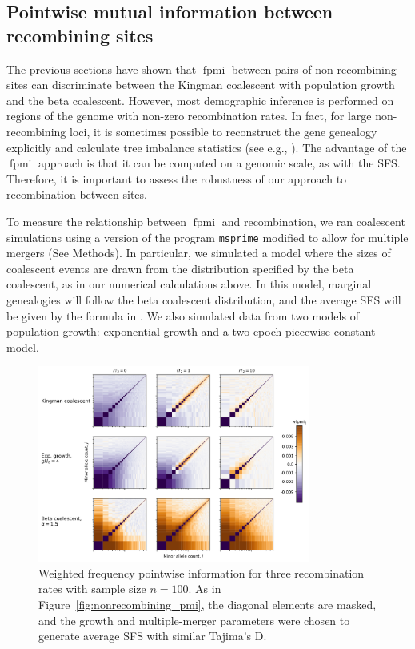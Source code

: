 \documentclass[11pt, letterpaper]{article}   	%
\newcommand{\Fig}[1]{Figure~\ref{#1}}
\DeclareMathOperator{\fpmi}{fpmi}
\begin{document}
\subsection*{Pointwise mutual information between recombining sites}

The previous sections have shown that $\fpmi$ between pairs of non-recombining sites can discriminate between the Kingman coalescent with population growth and the beta coalescent.
However, most demographic inference is performed on regions of the genome with non-zero recombination rates.
In fact, for large non-recombining loci, it is sometimes possible to reconstruct the gene genealogy explicitly and calculate tree imbalance statistics (see e.g., \cite{Seger2010}).
The advantage of the $\fpmi$ approach is that it can be computed on a genomic scale, as with the SFS.
Therefore, it is important to assess the robustness of our approach to recombination between sites.

To measure the relationship between $\fpmi$ and recombination, we ran coalescent simulations using a version of the program \texttt{msprime} \cite{KehellerEtAl201?} modified to allow for multiple mergers (See Methods).
In particular, we simulated a model where the sizes of coalescent events are drawn from the distribution specified by the beta coalescent, as in our numerical calculations above.
In this model, marginal genealogies will follow the beta coalescent distribution, and the average SFS will be given by the formula in \cite{BirknerEtAl2013}.
We also simulated data from two models of population growth: exponential growth and a two-epoch piecewise-constant model.

\begin{figure}
\centering
\includegraphics[width=0.8\textwidth]{figures/wfpmi_with_recombination.pdf}
\caption{Weighted frequency pointwise information for three recombination rates with sample size $n=100$. As in \Fig{fig:nonrecombining_pmi}, the diagonal elements are masked, and the growth and multiple-merger parameters were chosen to generate average SFS with similar Tajima's D. \label{fig:wpmi_recombination}}
\end{figure}
\end{document}

